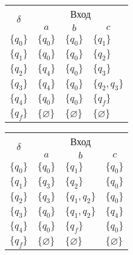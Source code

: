 \begin{enumerate}[label=(\roman{*})]
\begin{enumerate}
\begin{figure}
\centering
\begin{subfigure}[b]{.4\linewidth}
\centering
			\begin{tabular}{llll}
				\toprule
				\multicolumn{1}{c}{\multirow{2}{*}{\Large $\delta$}}
				& \multicolumn{3}{c}{Вход} \\
				\cmidrule(rl){2-4}
				& \multicolumn{1}{c}{$a$}
				& \multicolumn{1}{c}{$b$} 
				& \multicolumn{1}{c}{$c$} \\
				\midrule
				$\{q_0\}$       & $\{q_0\}$      		 & $\{q_0\}$     &$\{q_1\}$  \\
				$\{q_1\}$       & $\{q_0\}$    			 & $\{q_0\}$     &$\{q_2\}$ \\
				$\{q_2\}$       & $\{q_4\}$    			 & $\{q_0\}$     &$\{q_3\}$  \\
				$\{q_3\}$       & $\{q_4\}$    			 & $\{q_0\}$     &$\{q_2, q_3\}$  \\
				$\{q_4\}$       & $\{q_0\}$    			 & $\{q_0\}$     &$\{q_f\}$  \\
				$\{q_f\}$       & $\{\varnothing\}$    	 & $\{\varnothing\}$     &$\{\varnothing\}$  \\
				\bottomrule
			\end{tabular}
\caption{}\label{app-ex-task2-1}
\end{subfigure}%
%
\begin{subfigure}[b]{.4\linewidth}
\centering
			\begin{tabular}{llll}
				\toprule
				\multicolumn{1}{c}{\multirow{2}{*}{\Large $\delta$}}
				& \multicolumn{3}{c}{Вход} \\
				\cmidrule(rl){2-4}
				& \multicolumn{1}{c}{$a$}
				& \multicolumn{1}{c}{$b$} 
				& \multicolumn{1}{c}{$c$} \\
				\midrule
				$\{q_0\}$       & $\{q_0\}$      		 & $\{q_1\}$     &$\{q_0\}$  \\
				$\{q_1\}$       & $\{q_3\}$    			 & $\{q_2\}$     &$\{q_0\}$ \\
				$\{q_2\}$       & $\{q_3\}$    			 & $\{q_1, q_2\}$     &$\{q_0\}$  \\
				$\{q_3\}$       & $\{q_0\}$    			 & $\{q_1, q_2\}$     &$\{q_4\}$  \\
				$\{q_4\}$       & $\{q_0\}$    			 & $\{q_f\}$     &$\{q_0\}$  \\
				$\{q_f\}$       & $\{\varnothing\}$    	 & $\{\varnothing\}$     &$\{\varnothing\}$  \\
				\bottomrule
			\end{tabular}
\caption{}\label{app-ex-task2-2}
\end{subfigure}
\caption{}\label{app-ex-task2-3}
\end{figure}
		

\end{enumerate}
\end{enumerate}
